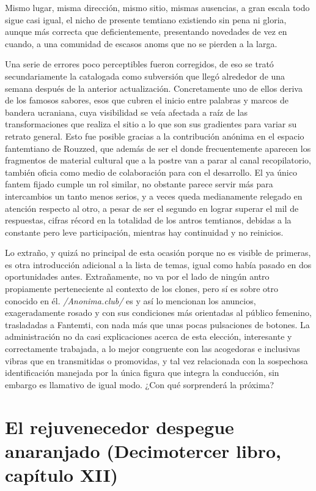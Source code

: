 \documentclass[
]{book}
\begin{document}
Mismo lugar, misma dirección, mismo sitio, mismas ausencias, a gran escala todo sigue casi igual, el nicho de presente temtiano existiendo sin pena ni gloria, aunque más correcta que deficientemente, presentando novedades de vez en cuando, a una comunidad de escasos anoms que no se pierden a la larga.

Una serie de errores poco perceptibles fueron corregidos, de eso se trató secundariamente la catalogada como subversión que llegó alrededor de una semana después de la anterior actualización. Concretamente uno de ellos deriva de los famosos sabores, esos que cubren el inicio entre palabras y marcos de bandera ucraniana, cuya visibilidad se veía afectada a raíz de las transformaciones que realiza el sitio a lo que son sus gradientes para variar su retrato general. Esto fue posible gracias a la contribución anónima en el espacio fantemtiano de Rouzzed, que además de ser el donde frecuentemente aparecen los fragmentos de material cultural que a la postre van a parar al canal recopilatorio, también oficia como medio de colaboración para con el desarrollo. El ya único fantem fijado cumple un rol similar, no obstante parece servir más para intercambios un tanto menos serios, y a veces queda medianamente relegado en atención respecto al otro, a pesar de ser el segundo en lograr superar el mil de respuestas, cifras récord en la totalidad de los antros temtianos, debidas a la constante pero leve participación, mientras hay continuidad y no reinicios.

Lo extraño, y quizá no principal de esta ocasión porque no es visible de primeras, es otra introducción adicional a la lista de temas, igual como había pasado en dos oportunidades antes. Extrañamente, no va por el lado de ningún antro propiamente perteneciente al contexto de los clones, pero sí es sobre otro conocido en él. \emph{/Anonima.club/} es y así lo mencionan los anuncios, exageradamente rosado y con sus condiciones más orientadas al público femenino, trasladadas a Fantemti, con nada más que unas pocas pulsaciones de botones. La administración no da casi explicaciones acerca de esta elección, interesante y correctamente trabajada, a lo mejor congruente con las acogedoras e inclusivas vibras que en transmitidas o promovidas, y tal vez relacionada con la sospechosa identificación manejada por la única figura que integra la conducción, sin embargo es llamativo de igual modo. ¿Con qué sorprenderá la próxima?

\hypertarget{el-rejuvenecedor-despegue-anaranjado-decimotercer-libro-capuxedtulo-xii}{%
\section{El rejuvenecedor despegue anaranjado (Decimotercer libro, capítulo XII)}\label{el-rejuvenecedor-despegue-anaranjado-decimotercer-libro-capuxedtulo-xii}}
\end{document}
